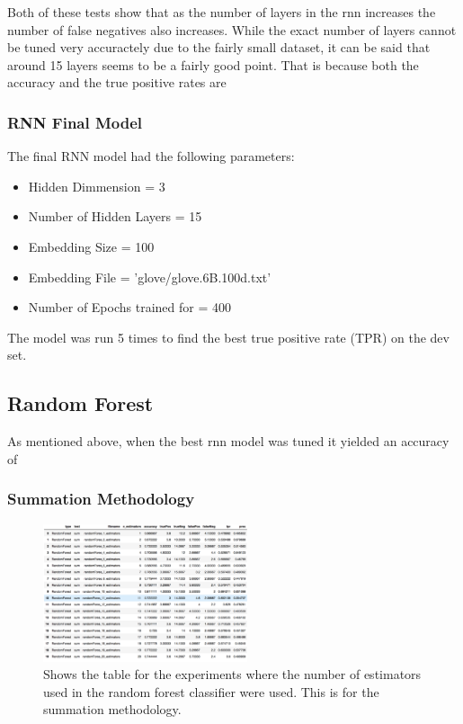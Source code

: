 \documentclass[twoside,twocolumn]{article}
\begin{document}
Both of these tests show that as the number of layers in the rnn increases the number of false
negatives also increases. While the exact number of layers cannot be tuned very accuractely
due to the fairly small dataset, it can be said that around 15 layers seems to be a fairly good point. 
That is because both the accuracy and the true positive rates are 


\subsubsection{RNN Final Model}

The final RNN model had the following parameters:
\begin{itemize}
\item Hidden Dimmension = 3
\item Number of Hidden Layers = 15
\item Embedding Size = 100
\item Embedding File = 'glove/glove.6B.100d.txt'
\item Number of Epochs trained for = 400 
\end{itemize}

The model was run 5 times to find the best true positive rate (TPR) on the dev set.



\subsection{Random Forest}

As mentioned above, when the best rnn model was tuned it yielded an accuracy of 


\subsubsection{Summation Methodology}

\begin{figure}[H]
\includegraphics[width=6cm]{randForest_estimators_summed_table}
\centering
\caption{Shows the table for the experiments where the number of estimators used
in the random forest classifier were used. This is for the summation methodology.}
\end{figure}
\end{document}
